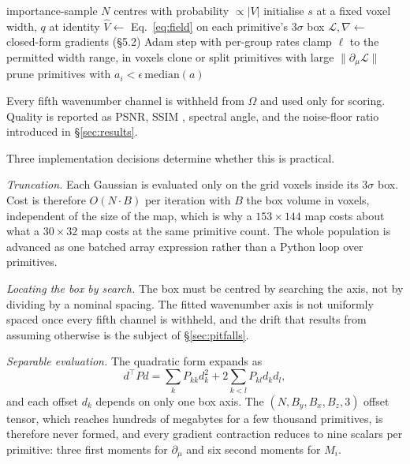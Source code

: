 \begin{algorithm}[t]
\caption{S3DGS fit (pure NumPy)}\label{alg:fit}
\begin{algorithmic}[1]
\State importance-sample $N$ centres with probability $\propto |V|$
\State initialise $s$ at a fixed voxel width, $q$ at identity
  \State $\widehat V \gets$ Eq.~\eqref{eq:field} on each primitive's $3\sigma$ box
  \State $\mathcal L,\nabla \gets$ closed-form gradients (\S5.2)
  \State Adam step \cite{kingma2015adam} with per-group rates
  \State clamp $\ell$ to the permitted width range, in voxels
    \State clone or split primitives with large $\lVert\partial_\mu\mathcal L\rVert$
    \State prune primitives with $a_i < \epsilon\,\mathrm{median}(a)$
  \EndIf
\EndFor
\end{algorithmic}
\end{algorithm}

Every fifth wavenumber channel is withheld from $\Omega$ and used only for
scoring. Quality is reported as PSNR, SSIM \cite{wang2004ssim}, spectral angle,
and the noise-floor ratio introduced in \S\ref{sec:results}.

Three implementation decisions determine whether this is practical.

\emph{Truncation.} Each Gaussian is evaluated only on the grid voxels inside
its $3\sigma$ box. Cost is therefore $O(N \cdot B)$ per iteration with $B$ the
box volume in voxels, independent of the size of the map, which is why a
$153\times144$ map costs about what a $30\times32$ map costs at the same
primitive count. The whole population is advanced as one batched array
expression \cite{harris2020numpy} rather than a Python loop over primitives.

\emph{Locating the box by search.} The box must be centred by searching the
axis, not by dividing by a nominal spacing. The fitted wavenumber axis is not
uniformly spaced once every fifth channel is withheld, and the drift that
results from assuming otherwise is the subject of \S\ref{sec:pitfalls}.

\emph{Separable evaluation.} The quadratic form expands as
\begin{equation}
d^{\!\top}\! P d = \sum_{k} P_{kk} d_k^2 + 2\!\!\sum_{k<l}\!\! P_{kl} d_k d_l ,
\end{equation}
and each offset $d_k$ depends on only one box axis. The
$(N, B_y, B_x, B_z, 3)$ offset tensor, which reaches hundreds of megabytes for
a few thousand primitives, is therefore never formed, and every gradient
contraction reduces to nine scalars per primitive: three first moments for
$\partial_\mu$ and six second moments for $M_i$.

